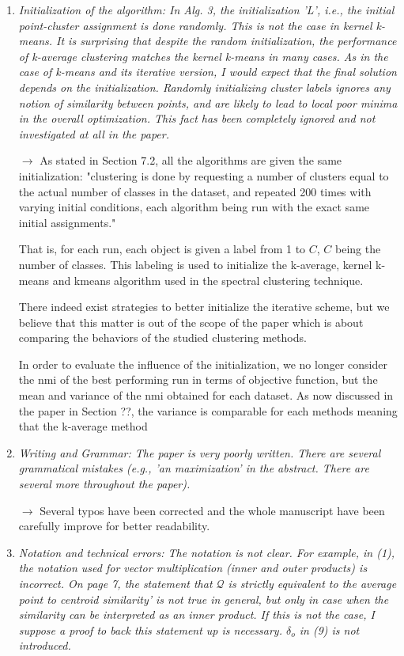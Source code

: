 \documentclass[10pt]{article}
\begin{document}
\begin{enumerate}
\item \emph{Initialization of the algorithm:
In Alg. 3, the initialization 'L', i.e., the initial point-cluster assignment is done randomly. This is not the case in kernel k-means. It is surprising that despite the random initialization, the performance of k-average clustering matches the kernel k-means in many cases. As in the case of k-means and its iterative version, I would expect that the final solution depends on the initialization. Randomly initializing cluster labels ignores any notion of similarity between points, and are likely to lead to local poor minima in the overall optimization. This fact has been completely ignored and not investigated at all in the paper.}

$\rightarrow$ As stated in Section 7.2, all the algorithms are given the same initialization: "clustering is done by requesting a number of clusters equal to the actual number of classes in the dataset, and repeated 200 times with varying initial conditions, each algorithm being run with the exact same initial assignments."

That is, for each run, each object is given a label from 1 to $C$, $C$ being the number of classes. This labeling is used to initialize the k-average, kernel k-means and kmeans algorithm used in the spectral clustering technique.

There indeed exist strategies to better initialize the iterative scheme, but we believe that this matter is out of the scope of the paper which is about comparing the behaviors of the studied clustering methods.

In order to evaluate the influence of the initialization, we no longer consider the nmi of the best performing run in terms of objective function, but the mean and variance of the nmi obtained for each dataset. As now discussed in the paper in Section ??, the variance is comparable for each methods meaning that the k-average method

\item \emph{Writing and Grammar: The paper is very poorly written. There are several grammatical mistakes (e.g., 'an maximization' in the abstract. There are several more throughout the paper).}

$\rightarrow$ Several typos have been corrected and the whole manuscript have been carefully improve for better readability.

\item \emph{Notation and technical errors:
The notation is not clear. For example, in (1), the notation used for vector multiplication (inner and outer products) is incorrect. On page 7, the statement that $\mathcal{Q}$ is strictly equivalent to the average point to centroid similarity' is not true in general, but only in case when the similarity can be interpreted as an inner product. If this is not the case, I suppose a proof to back this statement up is necessary. $\delta_o$ in (9) is not introduced.}


\end{enumerate}
\end{document}

